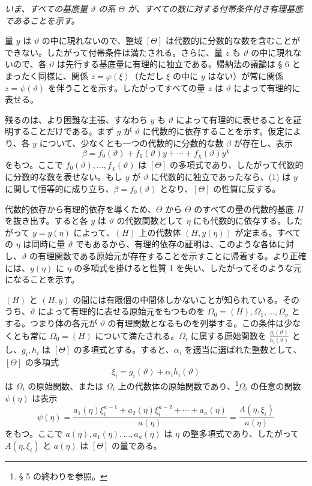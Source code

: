 \emph{いま、すべての基底量 $\vartheta$ の系 $\Theta$ が、すべての数に対する付帯条件付き有理基底であることを示す。}

量 $y$ は $\vartheta$ の中に現れないので、整域 $[\Theta]$ は代数的に分数的な数を含むことができない。したがって付帯条件は満たされる。さらに、量 $z$ も $\vartheta$ の中に現れないので、各 $\vartheta$ は先行する基底量に有理的に独立である。帰納法の議論は § 6 とまったく同様に、関係 $z=\varphi(\xi)$（ただし $\xi$ の中に $y$ はない）が常に関係 $z=\psi(\vartheta)$ を伴うことを示す。したがってすべての量 $z$ は $\vartheta$ によって有理的に表せる。

残るのは、より困難な主張、すなわち $y$ も $\vartheta$ によって有理的に表せることを証明することだけである。まず $y$ が $\vartheta$ に代数的に依存することを示す。仮定により、各 $y$ について、少なくとも一つの代数的に分数的な数 $\beta$ が存在し、表示
\begin{equation}
\beta=f_0(\vartheta)+f_1(\vartheta)y+\cdots+f_\chi(\vartheta)y^\chi
\tag{1}
\end{equation}
をもつ。ここで $f_0(\vartheta),\ldots,f_\chi(\vartheta)$ は $[\Theta]$ の多項式であり、したがって代数的に分数的な数を表せない。もし $y$ が $\vartheta$ に代数的に独立であったなら、(1) は $y$ に関して恒等的に成り立ち、$\beta=f_0(\vartheta)$ となり、$[\Theta]$ の性質に反する。

代数的依存から有理的依存を導くため、$\Theta$ から $\Theta$ のすべての量の代数的基底 $H$ を抜き出す。すると各 $y$ は $\vartheta$ の代数関数として $\eta$ にも代数的に依存する。したがって $y=y(\eta)$ によって、$(H)$ 上の代数体 $(H,y(\eta))$ が定まる。すべての $\eta$ は同時に量 $\vartheta$ でもあるから、有理的依存の証明は、このような各体に対し、$\vartheta$ の有理関数である原始元が存在することを示すことに帰着する。より正確には、$y(\eta)$ に $\eta$ の多項式を掛けると性質 1 を失い、したがってそのような元になることを示す。

$(H)$ と $(H,y)$ の間には有限個の中間体しかないことが知られている。そのうち、$\vartheta$ によって有理的に表せる原始元をもつものを $\Omega_0=(H),\Omega_1,\ldots,\Omega_\sigma$ とする。つまり体の各元が $\vartheta$ の有理関数となるものを列挙する。この条件は少なくとも常に $\Omega_0=(H)$ について満たされる。$\Omega_i$ に属する原始関数を $\frac{g_i(\vartheta)}{h_i(\vartheta)}$ とし、$g_i,h_i$ は $[\Theta]$ の多項式とする。すると、$\alpha_i$ を適当に選ばれた整数として、$[\Theta]$ の多項式
\[
 \xi_i=g_i(\vartheta)+\alpha_i h_i(\vartheta)
\]
は $\Omega_i$ の原始関数、または $\Omega_i$ 上の代数体の原始関数であり、\footnote{§ 5 の終わりを参照。}$\Omega_i$ の任意の関数 $\psi(\eta)$ は表示
\begin{equation}
\psi(\eta)=
\frac{a_1(\eta)\xi_i^{\kappa-1}+a_2(\eta)\xi_i^{\kappa-2}+\cdots+a_\kappa(\eta)}
     {a(\eta)}
=\frac{A(\eta,\xi_i)}{a(\eta)}
\tag{2}
\end{equation}
をもつ。ここで $a(\eta),a_1(\eta),\ldots,a_\kappa(\eta)$ は $\eta$ の整多項式であり、したがって $A(\eta,\xi_i)$ と $a(\eta)$ は $[\Theta]$ の量である。

